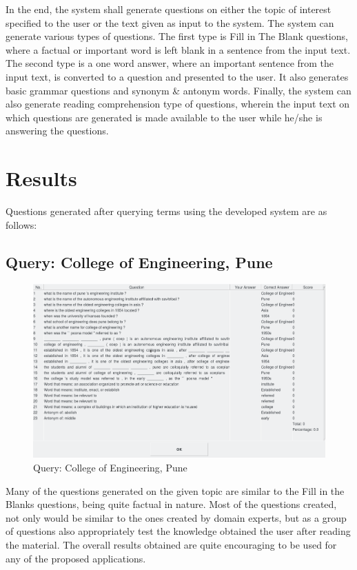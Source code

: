 In the end, the system shall generate questions on either the topic of interest
specified to the user or the text given as input to the system. The system can
generate various types of questions. The first type is Fill in The Blank
questions, where a factual or important word is left blank in a sentence from
the input text. The second type is a one word answer, where an important
sentence from the input text, is converted to a question and presented to the
user. It also generates basic grammar questions and synonym \& antonym words.
Finally, the system can also generate reading comprehension type of questions,
wherein the input text on which questions are generated is made available to the
user while he/she is answering the questions.

\section{Results}

Questions generated after querying terms using the developed system are as
follows:

\subsection{Query: College of Engineering, Pune}

\begin{figure}
	\caption{Query: College of Engineering, Pune}
	\centering\includegraphics[width=12cm]{9.png}
\end{figure}

Many of the questions generated on the given topic are similar to the Fill in
the Blanks questions, being quite factual in nature. Most of the questions
created, not only would be similar to the ones created by domain experts, but as
a group of questions also appropriately test the knowledge obtained the user
after reading the material. The overall results obtained are quite encouraging
to be used for any of the proposed applications.

